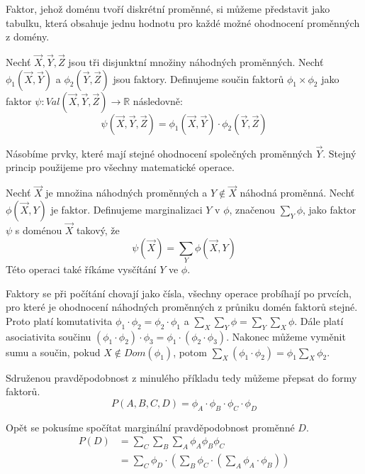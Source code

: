 Faktor, jehož doménu tvoří diskrétní proměnné, si můžeme představit jako tabulku, která obsahuje jednu hodnotu pro každé možné ohodnocení proměnných z domény.

Nechť $\vec{X}, \vec{Y}, \vec{Z}$ jsou tři disjunktní množiny náhodných proměnných.
Nechť $\phi_1(\vec{X}, \vec{Y})$ a $\phi_2(\vec{Y}, \vec{Z})$ jsou faktory.
Definujeme součin faktorů $\phi_1 \times \phi_2$ jako faktor $\psi: Val(\vec{X}, \vec{Y}, \vec{Z}) \rightarrow \mathbb{R}$ následovně:
\begin{equation*}
\psi(\vec{X}, \vec{Y}, \vec{Z}) = \phi_1(\vec{X}, \vec{Y}) \cdot \phi_2(\vec{Y}, \vec{Z})
\end{equation*}

Násobíme prvky, které mají stejné ohodnocení společných proměnných $\vec{Y}$.
Stejný princip použijeme pro všechny matematické operace.

Nechť $\vec{X}$ je množina náhodných proměnných a $Y \not\in \vec{X}$ náhodná proměnná. 
Nechť $\phi(\vec{X}, Y)$ je faktor.
Definujeme marginalizaci $Y$ v $\phi$, značenou $\sum_Y \phi$, jako faktor $\psi$ s doménou $\vec{X}$ takový, že
\begin{equation*}
    \psi(\vec{X}) = \sum_Y \phi(\vec{X}, Y)
\end{equation*}
Této operaci také říkáme vysčítání $Y$ ve $\phi$.

Faktory se při počítání chovají jako čísla, všechny operace probíhají po prvcích, pro které je ohodnocení náhodných proměnných z průniku domén faktorů stejné.
Proto platí komutativita $\phi_1 \cdot \phi_2 = \phi_2 \cdot \phi_1$ a $\sum_X \sum_Y \phi = \sum_Y \sum_X \phi$.
Dále platí asociativita součinu $(\phi_1 \cdot \phi_2) \cdot \phi_3 = \phi_1 \cdot (\phi_2 \cdot \phi_3)$.
Nakonec můžeme vyměnit sumu a součin, pokud $X \not\in Dom(\phi_1)$, potom $\sum_X (\phi_1 \cdot \phi_2) = \phi_1 \sum_X \phi_2$.

Sdruženou pravděpodobnost z minulého příkladu tedy můžeme přepsat do formy faktorů.
\begin{equation}
    P(A, B, C, D) = \phi_A \cdot \phi_B \cdot \phi_C \cdot \phi_D
\end{equation}

Opět se pokusíme spočítat marginální pravděpodobnost proměnné $D$.
\begin{align}
P(D) &= \sum_C \sum_B \sum_A \phi_A \phi_B \phi_C
\\
&= \sum_C 
	\phi_D \cdot 
	\left( 
		\sum_B 
			\phi_C \cdot 
			\left( 
				\sum_A 
					\phi_A \cdot \phi_B
			\right)
	\right)
\end{align}

